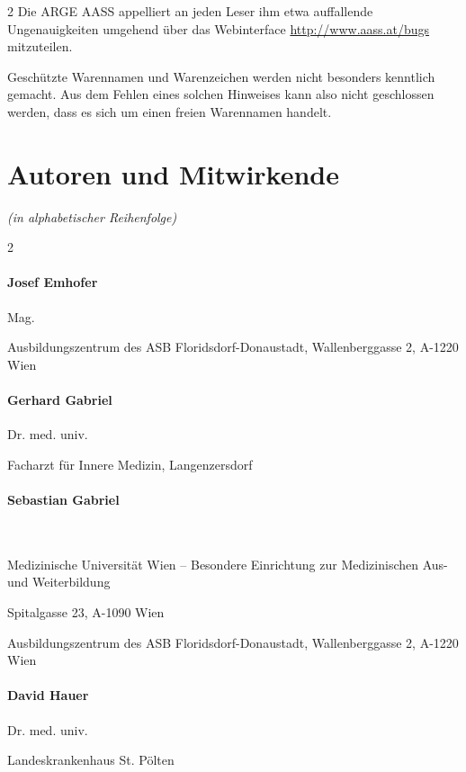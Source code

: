 \documentclass[ngerman,a4paper,fontsize=9pt,BCOR=1.5cm,headings=big,draft=no]{scrbook}
\begin{document}
\begin{multicols}{2}
Die ARGE AASS appelliert an jeden Le\-ser ihm etwa auffallende Un\-ge\-nau\-igkei\-ten umgehend über
das Webinterface \url{http://www.aass.at/bugs} mitzuteilen.

Geschützte Waren\-namen und Wa\-ren\-zei\-chen werden nicht besonders
kenntlich ge\-macht. Aus dem Fehlen eines solchen Hin\-weises kann also
nicht ge\-schlossen werden, dass es sich um einen freien Waren\-namen
handelt.
\end{multicols}

\clearpage
\section*{Autoren und Mitwirkende}

\emph{\tiny{(in alphabetischer Reihenfolge)}}


\begin{multicols}{2}
    
 \paragraph{Josef Emhofer}
    Mag. 
    
    Ausbildungszentrum des ASB Floridsdorf-Donaustadt,    
    Wallenberggasse 2, A-1220 Wien\\

    \paragraph{Gerhard Gabriel}
    Dr. med. univ.
    
    Facharzt f\"ur Innere Medizin, Langenzersdorf
    
    \paragraph{Sebastian Gabriel}~
    
    Medizinische Universität Wien -- Besondere Einrichtung zur
    Medizinischen Aus- und Weiterbildung
    
    Spitalgasse 23, A-1090 Wien

    Ausbildungszentrum des ASB Floridsdorf-Donaustadt,    
    Wallenberggasse 2, A-1220 Wien
    
    \paragraph{David Hauer}
    Dr. med. univ.
    
    Landeskrankenhaus St. Pölten
    

\end{multicols}
\end{document}

